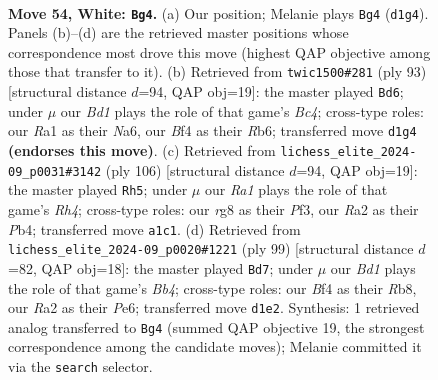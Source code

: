 \documentclass[11pt]{article}
\begin{document}
\clearpage

\begin{figure}[p]\centering
\begin{subfigure}{0.46\textwidth}\centering
\resizebox{\linewidth}{!}{%
\newchessgame
\chessboard[
  setfen={5br1/p4nkp/P7/3r4/5B2/1Pp3KP/R1P3P1/R2B4 w - - 15 54},
  showmover=false,
  pgfstyle=straightmove, color=movearrow, markmove={d1-g4}
]}
\caption{}
\end{subfigure}\hfill
\begin{subfigure}{0.46\textwidth}\centering
\resizebox{\linewidth}{!}{%
\newchessgame
\chessboard[
  setfen={8/4k1p1/nr3p1p/1pb4P/6P1/3BPP2/2R1K3/4B3 b - - 5 47},
  showmover=false,
  pgfstyle=straightmove, color=movearrow, markmove={c5-d6}
]}
\caption{}
\end{subfigure}
\\[4pt]
\begin{subfigure}{0.46\textwidth}\centering
\resizebox{\linewidth}{!}{%
\newchessgame
\chessboard[
  setfen={7r/4nk1P/5r2/1p1p4/pP4RR/P2B1P2/3K2P1/8 w - - 1 54},
  showmover=false,
  pgfstyle=straightmove, color=movearrow, markmove={h4-h5}
]}
\caption{}
\end{subfigure}\hfill
\begin{subfigure}{0.46\textwidth}\centering
\resizebox{\linewidth}{!}{%
\newchessgame
\chessboard[
  setfen={1r4k1/1r3p1p/4p1pP/1b2P1P1/p7/B7/1R4PK/2R5 b - - 22 50},
  showmover=false,
  pgfstyle=straightmove, color=movearrow, markmove={b5-d7}
]}
\caption{}
\end{subfigure}
\caption{\textbf{Move 54, White: \texttt{Bg4}.} (a) Our position; Melanie plays \texttt{Bg4} (\texttt{d1g4}). Panels (b)--(d) are the retrieved master positions whose correspondence most drove this move (highest QAP objective among those that transfer to it). (b) Retrieved from \texttt{twic1500\#281} (ply 93) [structural distance $d$=94, QAP obj=19]: the master played \texttt{Bd6}; under $\mu$ our \emph{Bd1} plays the role of that game's \emph{Bc4}; cross-type roles: our \emph{R}a1 as their \emph{N}a6, our \emph{B}f4 as their \emph{R}b6; transferred move \texttt{d1g4} \textbf{(endorses this move)}. (c) Retrieved from \texttt{lichess\_elite\_2024-09\_p0031\#3142} (ply 106) [structural distance $d$=94, QAP obj=19]: the master played \texttt{Rh5}; under $\mu$ our \emph{Ra1} plays the role of that game's \emph{Rh4}; cross-type roles: our \emph{r}g8 as their \emph{P}f3, our \emph{R}a2 as their \emph{P}b4; transferred move \texttt{a1c1}. (d) Retrieved from \texttt{lichess\_elite\_2024-09\_p0020\#1221} (ply 99) [structural distance $d$=82, QAP obj=18]: the master played \texttt{Bd7}; under $\mu$ our \emph{Bd1} plays the role of that game's \emph{Bb4}; cross-type roles: our \emph{B}f4 as their \emph{R}b8, our \emph{R}a2 as their \emph{P}e6; transferred move \texttt{d1e2}. Synthesis: 1 retrieved analog transferred to \texttt{Bg4} (summed QAP objective 19, the strongest correspondence among the candidate moves); Melanie committed it via the \texttt{search} selector.}
\label{fig:thought-m106}
\end{figure}
\end{document}
